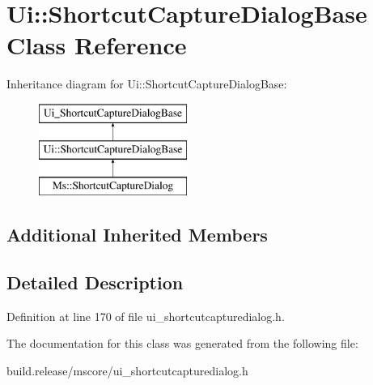 \hypertarget{class_ui_1_1_shortcut_capture_dialog_base}{}\section{Ui\+:\+:Shortcut\+Capture\+Dialog\+Base Class Reference}
\label{class_ui_1_1_shortcut_capture_dialog_base}
Inheritance diagram for Ui\+:\+:Shortcut\+Capture\+Dialog\+Base\+:\begin{figure}[H]
\begin{center}
\leavevmode
\includegraphics[height=3.000000cm]{class_ui_1_1_shortcut_capture_dialog_base}
\end{center}
\end{figure}
\subsection*{Additional Inherited Members}


\subsection{Detailed Description}


Definition at line 170 of file ui\+\_\+shortcutcapturedialog.\+h.



The documentation for this class was generated from the following file\+:\begin{DoxyCompactItemize}
\item 
build.\+release/mscore/ui\+\_\+shortcutcapturedialog.\+h\end{DoxyCompactItemize}
